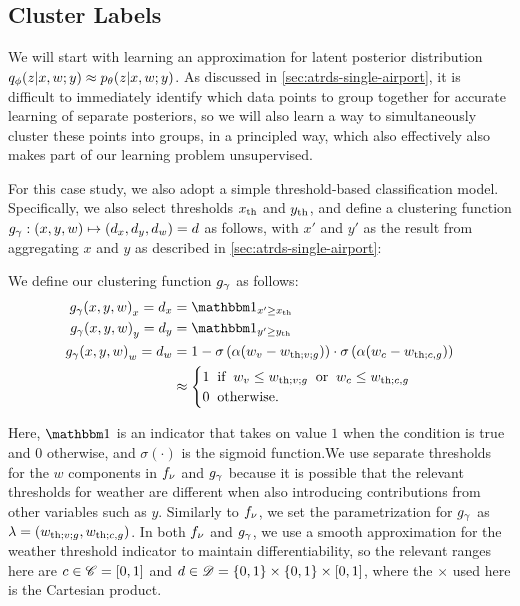 \subsection{Cluster Labels}

We will start with learning an approximation for latent posterior distribution $\qvd{z\given x,w;y}\approx \pld{z\given x,w;y}$. As discussed in \cref{sec:atrds-single-airport}, it is difficult to immediately identify which data points to group together for accurate learning of separate posteriors, so we will also learn a way to simultaneously cluster these points into groups, in a principled way, which also effectively also makes part of our learning problem unsupervised.

For this case study, we also adopt a simple threshold-based classification model. Specifically, we also select thresholds $x_{\mathrm{th}}$ and $y_{\mathrm{th}}$, and define a clustering function $g_{\gamma}:(x,y,w)\mapsto (d_x,d_y,d_w)=d$ as follows, with $x'$ and $y'$ as the result from aggregating $x$ and $y$ as described in \cref{sec:atrds-single-airport}:
\begin{proposition}
    We define our clustering function $g_{\gamma}$ as follows:
    \begin{align}
        \gvd{x,y,w}_x = d_x &= \mbm1_{x'\ge\xth}\\
        \gvd{x,y,w}_y = d_y &= \mbm1_{y'\ge\yth}\\
        \gvd{x,y,w}_w = d_w & = 1 - \sigma\left(\alpha (w_v-\wthvg)\right)\cdot \sigma\left(\alpha (w_c-\wthcg )\right) \\
        &\approx \begin{cases}
            1 \;\; \text{if} \;\; w_v \leq \wthvg \;\; \text{or}\;\;  w_c \leq \wthcg \\
            0 \;\; \text{otherwise.}
        \end{cases}
    \end{align}
\end{proposition}

Here, $\mbm1$ is an indicator that takes on value $1$ when the condition is true and $0$ otherwise, and $\sigma(\cdot)$ is the sigmoid function.We use separate thresholds for the $w$ components in $f_{\nu}$ and $g_{\gamma}$ because it is possible that the relevant thresholds for weather are different when also introducing contributions from other variables such as $y$. Similarly to $f_{\nu}$, we set the parametrization for $g_{\gamma}$ as $\lambda = (w_{\mathrm{th};v;g}, w_{\mathrm{th};c,g})$. In both $f_{\nu}$ and $g_{\gamma}$, we use a smooth approximation for the weather threshold indicator to maintain differentiability, so the relevant ranges here are $c\in\mathscr{C}=[0,1]$ and $d\in \mathscr{D}=\{0,1\}\times \{0,1\}\times [0,1]$, where the $\times$ used here is the Cartesian product. 

